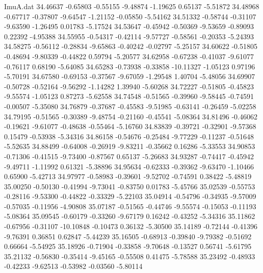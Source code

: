 \begin{filecontents}{ImuA.dat}
  34.46637   -0.65803   -0.55155   -9.48874   -1.19625    0.65137   -5.51872
  34.48968   -0.67717   -0.37807   -9.64547   -1.21152   -0.05850   -5.54162
  34.51332   -0.58744   -0.31107   -9.63590   -1.26495    0.01783   -5.17524
  34.53647   -0.45942   -0.50369   -9.53659   -0.89093    0.22392   -4.95388
  34.55955   -0.54317   -0.42114   -9.57727   -0.58561   -0.20353   -5.24393
  34.58275   -0.56112   -0.28834   -9.65863   -0.40242   -0.02797   -5.25157
  34.60622   -0.51805   -0.48694   -9.80339   -0.44822    0.59794   -5.20577
  34.62958   -0.67238   -0.41037   -9.61077   -0.76117    0.68190   -5.64085
  34.65283   -0.73938   -0.33858  -10.11327   -1.05123    0.97196   -5.70191
  34.67580   -0.69153   -0.37567   -9.67059   -1.29548    1.40704   -5.48056
  34.69907   -0.50728   -0.52164   -9.56292   -1.14282    1.39940   -5.60268
  34.72227   -0.51805   -0.45823   -9.55574   -1.05123    0.87273   -5.62558
  34.74548   -0.51565   -0.39960   -9.58445   -0.74591   -0.00507   -5.35080
  34.76879   -0.37687   -0.45583   -9.51985   -0.63141   -0.26459   -5.02258
  34.79195   -0.51565   -0.30389   -9.48754   -0.21160   -0.45541   -5.08364
  34.81496   -0.46062   -0.19621   -9.61077   -0.48638   -0.55464   -5.16760
  34.83839   -0.39721   -0.32901   -9.57368    0.15479   -0.53938   -5.34316
  34.86158   -0.54676   -0.25484   -9.77229   -0.11237   -0.51648   -5.52635
  34.88499   -0.64008   -0.26919   -9.83211   -0.35662    0.16286   -5.33553
  34.90853   -0.71306   -0.41515   -9.73400   -0.87567    0.65137   -5.26683
  34.93287   -0.74417   -0.45942   -9.49711   -1.11992    0.61321   -5.38896
  34.95634   -0.62333   -0.39362   -9.63470   -1.10466    0.65900   -5.42713
  34.97977   -0.58983   -0.39601   -9.52702   -0.74591    0.38422   -5.48819
  35.00250   -0.50130   -0.41994   -9.73041   -0.83750    0.01783   -5.45766
  35.02539   -0.55753   -0.28116   -9.53300   -0.44822   -0.33329   -5.22103
  35.04914   -0.54796   -0.34935   -9.57009   -0.57035   -0.11956   -4.90808
  35.07187   -0.51565   -0.44746   -9.55574   -0.15053   -0.11193   -5.08364
  35.09545   -0.60179   -0.33260   -9.67179    0.16242   -0.43252   -5.34316
  35.11862   -0.67956   -0.31107  -10.10848   -0.10473    0.36132   -5.30500
  35.14189   -0.72144   -0.41396   -9.76391    0.36851    0.62847   -5.44239
  35.16505   -0.68913   -0.39840   -9.79382   -0.51692    0.66664   -5.54925
  35.18926   -0.71904   -0.33858   -9.70648   -0.13527    0.56741   -5.61795
  35.21132   -0.56830   -0.35414   -9.45165   -0.55508    0.41475   -5.78588
  35.23492   -0.48933   -0.42233   -9.62513   -0.53982   -0.03560   -5.80114

\end{filecontents}

